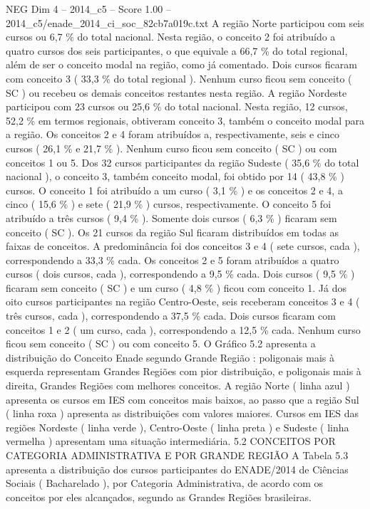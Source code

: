 \begin{textsample}{NEG Dim 4 – 2014\_c5 – Score 1.00 – 2014\_c5/enade\_2014\_ci\_soc\_82cb7a019c.txt}
A região Norte participou com seis cursos ou 6,7 \% do total nacional.
Nesta região, o conceito 2 foi atribuído a quatro cursos dos seis participantes, o que equivale a 66,7 \% do total regional, além de ser o conceito modal na região, como já comentado.
Dois cursos ficaram com conceito 3 ( 33,3 \% do total regional ).
Nenhum curso ficou sem conceito ( SC ) ou recebeu os demais conceitos restantes nesta região.
A região Nordeste participou com 23 cursos ou 25,6 \% do total nacional.
Nesta região, 12 cursos, 52,2 \% em termos regionais, obtiveram conceito 3, também o conceito modal para a região.
Os conceitos 2 e 4 foram atribuídos a, respectivamente, seis e cinco cursos ( 26,1 \% e 21,7 \% ).
Nenhum curso ficou sem conceito ( SC ) ou com conceitos 1 ou 5.
Dos 32 cursos participantes da região Sudeste ( 35,6 \% do total nacional ), o conceito 3, também conceito modal, foi obtido por 14 ( 43,8 \% ) cursos.
O conceito 1 foi atribuído a um curso ( 3,1 \% ) e os conceitos 2 e 4, a cinco ( 15,6 \% ) e sete ( 21,9 \% ) cursos, respectivamente.
O conceito 5 foi atribuído a três cursos ( 9,4 \% ).
Somente dois cursos ( 6,3 \% ) ficaram sem conceito ( SC ).
Os 21 cursos da região Sul ficaram distribuídos em todas as faixas de conceitos.
A predominância foi dos conceitos 3 e 4 ( sete cursos, cada ), correspondendo a 33,3 \% cada.
Os conceitos 2 e 5 foram atribuídos a quatro cursos ( dois cursos, cada ), correspondendo a 9,5 \% cada.
Dois cursos ( 9,5 \% ) ficaram sem conceito ( SC ) e um curso ( 4,8 \% ) ficou com conceito 1.
Já dos oito cursos participantes na região Centro-Oeste, seis receberam conceitos 3 e 4 ( três cursos, cada ), correspondendo a 37,5 \% cada.
Dois cursos ficaram com conceitos 1 e 2 ( um curso, cada ), correspondendo a 12,5 \% cada.
Nenhum curso ficou sem conceito ( SC ) ou com conceito 5.
O Gráfico 5.2 apresenta a distribuição do Conceito Enade segundo Grande Região : poligonais mais à esquerda representam Grandes Regiões com pior distribuição, e poligonais mais à direita, Grandes Regiões com melhores conceitos.
A região Norte ( linha azul ) apresenta os cursos em IES com conceitos mais baixos, ao passo que a região Sul ( linha roxa ) apresenta as distribuições com valores maiores.
Cursos em IES das regiões Nordeste ( linha verde ), Centro-Oeste ( linha preta ) e Sudeste ( linha vermelha ) apresentam uma situação intermediária. 5.2 CONCEITOS POR CATEGORIA ADMINISTRATIVA E POR GRANDE REGIÃO A Tabela 5.3 apresenta a distribuição dos cursos participantes do ENADE/2014 de Ciências Sociais ( Bacharelado ), por Categoria Administrativa, de acordo com os conceitos por eles alcançados, segundo as Grandes Regiões brasileiras.

\end{textsample}
